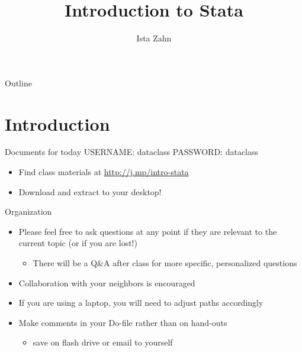 \documentclass[table,smaller]{beamer}
\institute{Harvard MIT Data Center}
\author{Ista Zahn}
\date{}
\title{Introduction to Stata}
\begin{document}
\maketitle
\begin{frame}{Outline}
\tableofcontents
\end{frame}



\section{Introduction}
\label{sec-1}

\begin{frame}[label=sec-1-1]{Documents for today}
USERNAME: dataclass
PASSWORD: dataclass
\begin{itemize}
\item Find class materials at \url{http://j.mp/intro-stata}
\item Download and extract to your desktop!
\end{itemize}
\end{frame}

\begin{frame}[label=sec-1-2]{Organization}
\begin{itemize}
\item Please feel free to ask questions at any point if they are relevant to the current topic (or if you are lost!)
\begin{itemize}
\item There will be a Q\&A after class for more specific, personalized questions
\end{itemize}
\item Collaboration with your neighbors is encouraged
\item If you are using a laptop, you will need to adjust paths accordingly
\item Make comments in your Do-file rather than on hand-outs  
\begin{itemize}
\item save on flash drive or email to yourself
\end{itemize}
\end{itemize}
\end{frame}
\end{document}
